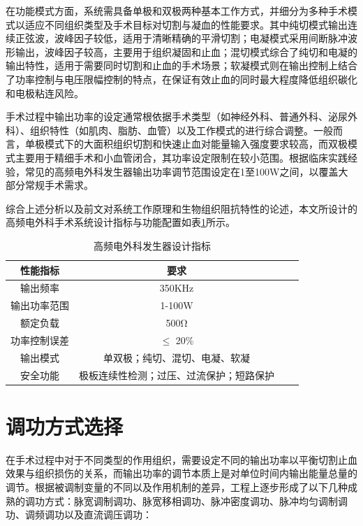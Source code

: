 在功能模式方面，系统需具备单极和双极两种基本工作方式，并细分为多种手术模式以适应不同组织类型及手术目标对切割与凝血的性能要求。其中纯切模式输出连续正弦波，波峰因子较低，适用于清晰精确的平滑切割；电凝模式采用间断脉冲波形输出，波峰因子较高，主要用于组织凝固和止血；混切模式综合了纯切和电凝的输出特性，适用于需要同时切割和止血的手术场景；软凝模式则在输出控制上结合了功率控制与电压限幅控制的特点，在保证有效止血的同时最大程度降低组织碳化和电极粘连风险。

手术过程中输出功率的设定通常根依据手术类型（如神经外科、普通外科、泌尿外科）、组织特性（如肌肉、脂肪、血管）以及工作模式的进行综合调整。一般而言，单极模式下的大面积组织切割和快速止血对能量输入强度要求较高，而双极模式主要用于精细手术和小血管闭合，其功率设定限制在较小范围。根据临床实践经验，常见的高频电外科发生器输出功率调节范围设定在1至100W之间，以覆盖大部分常规手术需求。

综合上述分析以及前文对系统工作原理和生物组织阻抗特性的论述，本文所设计的高频电外科手术系统设计指标与功能配置如表\ref{index}所示。
\begin{table}[htbp]
    \caption{\label{index}高频电外科发生器设计指标}
    \centering
    \small
    \setlength{\tabcolsep}{20pt}
	\begin{tabular}{ c c c c }
        \hline
        性能指标 & 要求\\
        \hline
        输出频率     &  350KHz\\
        输出功率范围  &  1-100W\\
        额定负载     &  500Ω\\
        功率控制误差  &  $\leq$ 20\% \\
        输出模式     &  单双极；纯切、混切、电凝、软凝\\
        安全功能     &  极板连续性检测；过压、过流保护；短路保护\\
        \hline
    \end{tabular}
\end{table}

\section{调功方式选择}
在手术过程中对于不同类型的作用组织，需要设定不同的输出功率以平衡切割止血效果与组织损伤的关系，而输出功率的调节本质上是对单位时间内输出能量总量的调节。根据被调制变量的不同以及作用机制的差异，工程上逐步形成了以下几种成熟的调功方式：脉宽调制调功、脉宽移相调功、脉冲密度调功、脉冲均匀调制调功、调频调功以及直流调压调功：

